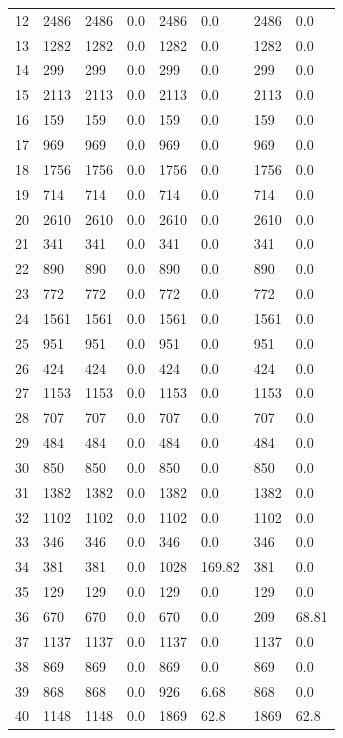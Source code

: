 \begin{longtable}{llllllll}
	12 & 2486 & 2486 & 0.0 & 2486 & 0.0 & 2486 & 0.0 \\
	13 & 1282 & 1282 & 0.0 & 1282 & 0.0 & 1282 & 0.0 \\
	14 & 299 & 299 & 0.0 & 299 & 0.0 & 299 & 0.0 \\
	15 & 2113 & 2113 & 0.0 & 2113 & 0.0 & 2113 & 0.0 \\
	16 & 159 & 159 & 0.0 & 159 & 0.0 & 159 & 0.0 \\
	17 & 969 & 969 & 0.0 & 969 & 0.0 & 969 & 0.0 \\
	18 & 1756 & 1756 & 0.0 & 1756 & 0.0 & 1756 & 0.0 \\
	19 & 714 & 714 & 0.0 & 714 & 0.0 & 714 & 0.0 \\
	20 & 2610 & 2610 & 0.0 & 2610 & 0.0 & 2610 & 0.0 \\
	21 & 341 & 341 & 0.0 & 341 & 0.0 & 341 & 0.0 \\
	22 & 890 & 890 & 0.0 & 890 & 0.0 & 890 & 0.0 \\
	23 & 772 & 772 & 0.0 & 772 & 0.0 & 772 & 0.0 \\
	24 & 1561 & 1561 & 0.0 & 1561 & 0.0 & 1561 & 0.0 \\
	25 & 951 & 951 & 0.0 & 951 & 0.0 & 951 & 0.0 \\
	26 & 424 & 424 & 0.0 & 424 & 0.0 & 424 & 0.0 \\
	27 & 1153 & 1153 & 0.0 & 1153 & 0.0 & 1153 & 0.0 \\
	28 & 707 & 707 & 0.0 & 707 & 0.0 & 707 & 0.0 \\
	29 & 484 & 484 & 0.0 & 484 & 0.0 & 484 & 0.0 \\
	30 & 850 & 850 & 0.0 & 850 & 0.0 & 850 & 0.0 \\
	31 & 1382 & 1382 & 0.0 & 1382 & 0.0 & 1382 & 0.0 \\
	32 & 1102 & 1102 & 0.0 & 1102 & 0.0 & 1102 & 0.0 \\
	33 & 346 & 346 & 0.0 & 346 & 0.0 & 346 & 0.0 \\
	34 & 381 & 381 & 0.0 & 1028 & 169.82 & 381 & 0.0 \\
	35 & 129 & 129 & 0.0 & 129 & 0.0 & 129 & 0.0 \\
	36 & 670 & 670 & 0.0 & 670 & 0.0 & 209 & 68.81 \\
	37 & 1137 & 1137 & 0.0 & 1137 & 0.0 & 1137 & 0.0 \\
	38 & 869 & 869 & 0.0 & 869 & 0.0 & 869 & 0.0 \\
	39 & 868 & 868 & 0.0 & 926 & 6.68 & 868 & 0.0 \\
	40 & 1148 & 1148 & 0.0 & 1869 & 62.8 & 1869 & 62.8 \\

\end{longtable}
